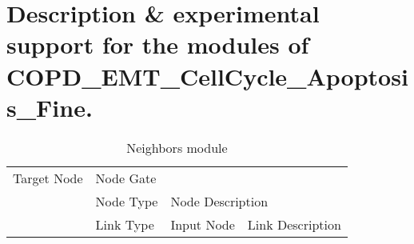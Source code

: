 \documentclass{article}
\newcommand*{\nodeoneaspec}{\dimexpr 0.14\textwidth-2\tabcolsep}
\newcommand*{\nodeonebspec}{\dimexpr 0.86\textwidth-2\tabcolsep}
\newcommand*{\nodetwoaspec}{\dimexpr 0.14\textwidth-2\tabcolsep}
\newcommand*{\nodetwobspec}{\dimexpr 0.13\textwidth-2\tabcolsep}
\newcommand*{\nodetwocspec}{\dimexpr 0.73\textwidth-2\tabcolsep}
\newcommand*{\linkaspec}{\dimexpr 0.14\textwidth-2\tabcolsep}
\newcommand*{\linkbspec}{\dimexpr 0.13\textwidth-2\tabcolsep}
\newcommand*{\linkcspec}{\dimexpr 0.14\textwidth-2\tabcolsep}
\newcommand*{\linkdspec}{\dimexpr 0.59\textwidth-2\tabcolsep}
\begin{document}
\newpage{}\section{Description \& experimental support for the modules of COPD\_{}EMT\_{}CellCycle\_{}Apoptosis\_{}Fine. 
}
\begin{subtables}\begin{longtable}[c]{@{}llll@{}}
\caption{Neighbors module}
\endhead{}\\
\toprule
\multicolumn{1}{p{\nodeoneaspec}}{Target Node}&\multicolumn{3}{m{\nodeonebspec}}{Node Gate}\\
\multicolumn{1}{m{\nodetwoaspec}}{}&\multicolumn{1}{m{\nodetwobspec}}{Node Type}&\multicolumn{2}{m{\nodetwocspec}}{Node Description}\\
\multicolumn{1}{m{\linkaspec}}{}&\multicolumn{1}{m{\linkbspec}}{Link Type}&\multicolumn{1}{m{\linkcspec}}{Input Node}&\multicolumn{1}{m{\linkdspec}}{Link Description}\\


\end{longtable}
\end{subtables}
\end{document}
